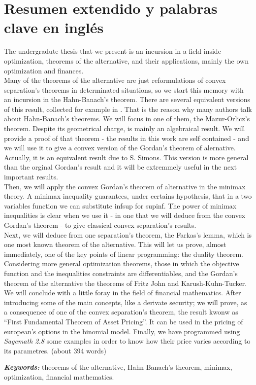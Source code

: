 \chapter{Resumen extendido y palabras clave en inglés}
The undergradute thesis that we present is an incursion in a field inside optimization, theorems of the alternative, and their applications, mainly the own optimization and finances.\\

Many of the theorems of the alternative are just reformulations of convex separation's theorems in determinated situations, so we start this memory with an incursion in the Hahn-Banach's theorem. There are several equivalent versions of this result, collected for example in \cite{schechter1996handbook}. That is the reason why many authors talk about Hahn-Banach's theorems. We will focus in one of them, the Mazur-Orlicz's theorem. Despite its geometrical charge, is mainly an algebraical result. We will provide a proof of that theorem - the results in this work are self contained -  and we will use it to give a convex version  of the Gordan's theorem of alernative. Actually, it is an equivalent result due to S. Simons. This version is more general than the orginal Gordan's result and it will be extremmely useful in the next important results. \\

Then, we will apply the convex Gordan's theorem of alternative in the minimax theory. A minimax inequality guarantees, under certains hypothesis, that in a two variables function we can substitute inf\hspace{0.5mm}sup for sup\hspace{0.5mm}inf. The power of minimax inequalities is clear when we use it - in one that we will deduce from the convex Gordan's theorem - to give classical convex separation's results. \\

Next, we will deduce from one separation's theorem, the Farkas's lemma, which is one most known theorem of the alternative. This will let us prove, almost immediately, one of the key points of linear programming: the duality theorem. Considering more general optimization theorems, those in which the objective function and the inequalities constraints are differentiables, and the Gordan's theorem of the alternative the theorems of Fritz John and Karush-Kuhn-Tucker.\\

We will conclude with a little foray in the field of financial mathematics. After introducing some of the main concepts, like a derivate security; we will prove, as a consequence of one of the convex separation's theorem, the result kwonw as ``First Fundamental Theorem of Asset Pricing''. It can be used in the pricing of european's options in the binomial model. Finally, we have programmed using \textit{Sagemath 2.8} some examples in order to know how their price varies according to its parametres. (about 394 words)\\

\providecommand{\keywords}[1]
{
	\small	
	\textbf{\textit{Keywords: }} #1
}
\keywords{theorems of the alternative, Hahn-Banach's theorem, minimax, optimization, financial mathematics.}